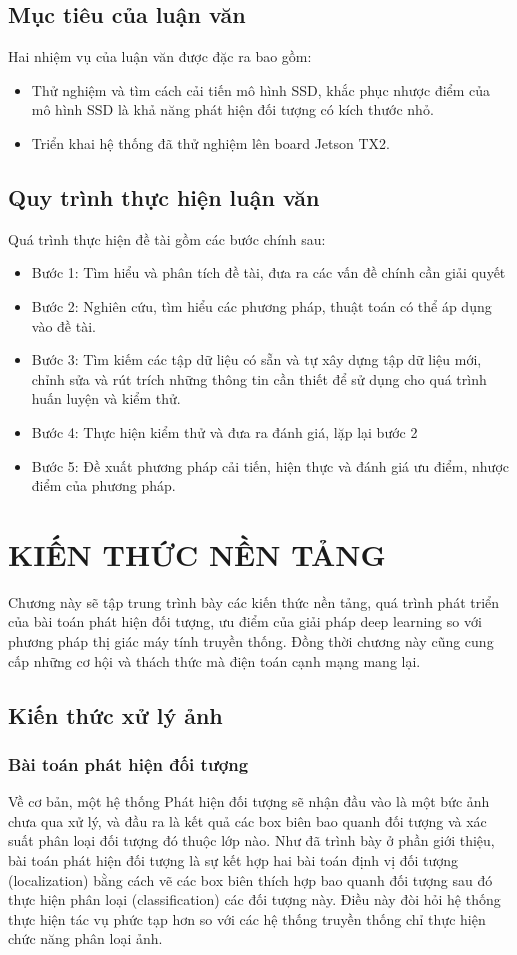 \documentclass[a4paper]{report}
\begin{document}
\section{Mục tiêu của luận văn}
Hai nhiệm vụ của luận văn được đặc ra bao gồm:
\begin{itemize}
\item Thử nghiệm và tìm cách cải tiến mô hình SSD, khắc phục nhược điểm của mô hình SSD là khả năng phát hiện đối tượng có kích thước nhỏ.
\item Triển khai hệ thống đã thử nghiệm lên board Jetson TX2.
\end{itemize} 

\section{Quy trình thực hiện luận văn}
Quá trình thực hiện đề tài gồm các bước chính sau: 
\begin{itemize}
	\item  Bước 1: Tìm hiểu và phân tích đề tài, đưa ra các vấn đề chính cần giải quyết
	\item  Bước 2: Nghiên cứu, tìm hiểu các phương pháp, thuật toán có thể áp dụng vào đề tài.
	\item  Bước 3: Tìm kiếm các tập dữ liệu có sẵn và tự xây dựng tập dữ liệu mới, chỉnh sửa và rút trích những thông tin cần thiết để sử dụng cho quá trình huấn luyện và kiểm thử. 
	\item  Bước 4: Thực hiện kiểm thử và đưa ra đánh giá, lặp lại bước 2
	\item  Bước 5: Đề xuất phương pháp cải tiến, hiện thực và đánh giá ưu điểm, nhược điểm của phương pháp.
\end{itemize} 

\chapter{KIẾN THỨC NỀN TẢNG}
Chương này sẽ tập trung trình bày các kiến thức nền tảng, quá trình phát triển của bài 
toán phát hiện đối tượng, ưu điểm của giải pháp deep learning so với phương pháp thị giác 
máy tính truyền thống. Đồng thời chương này cũng cung cấp những cơ hội và thách thức mà 
điện toán cạnh mạng mang lại. 

\section{Kiến thức xử lý ảnh}
\subsection{Bài toán phát hiện đối tượng}
Về cơ bản, một hệ thống Phát hiện đối tượng sẽ nhận đầu vào là một bức ảnh chưa qua xử lý, 
và đầu ra là kết quả các box biên bao quanh đối tượng và xác suất phân loại đối tượng đó 
thuộc lớp nào. Như đã trình bày ở phần giới thiệu, bài toán phát hiện đối tượng là sự kết
hợp hai bài toán định vị đối tượng (localization) bằng cách vẽ các box biên thích hợp bao 
quanh đối tượng sau đó thực hiện phân loại (classification) các đối tượng này. Điều này đòi 
hỏi hệ thống thực hiện tác vụ phức tạp hơn so với các hệ thống truyền thống chỉ thực hiện
chức năng phân loại ảnh. 
\end{document}
